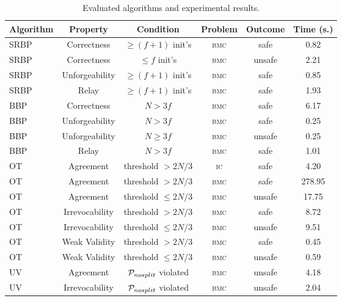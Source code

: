 \documentclass[11pt,a4paper]{article}
\begin{document}
{\begin{table}
\caption{\label{tabellone}Evaluated algorithms and experimental results.}
\centering
{\scriptsize
\begin{tabular}{|l|c|c|c|c|c|} \hline
\textbf{Algorithm} & \textbf{Property} & \textbf{Condition} & \textbf{Problem} & \textbf{Outcome} & \textbf{Time (s.)} \\ \hline
SRBP \cite{Srikanth87} & Correctness & $\geq (f+1)$ init's & \textsc{bmc} & safe & 0.82   \\ \hline
SRBP \cite{Srikanth87} & Correctness & $\leq f$ init's &  \textsc{bmc} & unsafe & 2.21  \\ \hline
SRBP \cite{Srikanth87} & Unforgeability & $\geq (f+1)$ init's & \textsc{bmc} & safe & 0.85  \\ \hline
SRBP \cite{Srikanth87} & Relay & $\geq (f+1)$ init's & \textsc{bmc} & safe & 1.93   \\ \hline
BBP \cite{toueg87} & Correctness & $N > 3f$ & \textsc{bmc} & safe & 6.17  \\ \hline
BBP \cite{toueg87} & Unforgeability & $N > 3f$ & \textsc{bmc} & safe & 0.25  \\ \hline
BBP \cite{toueg87} & Unforgeability & $N \geq 3f$ & \textsc{bmc} & unsafe & 0.25 \\ \hline
BBP \cite{toueg87} & Relay & $N > 3f$ & \textsc{bmc} & safe & 1.01  \\ \hline
OT \cite{sharpie} & Agreement & threshold $> 2N/3$ & \textsc{ic} & safe & 4.20 \\ \hline
OT \cite{sharpie} & Agreement & threshold $> 2N/3$ & \textsc{bmc} & safe & 278.95  \\ \hline
OT \cite{sharpie} & Agreement & threshold $\leq 2N/3$ & \textsc{bmc} & unsafe & 17.75  \\ \hline
OT \cite{sharpie} & Irrevocability & threshold $> 2N/3$ & \textsc{bmc} & safe & 8.72  \\ \hline
OT \cite{sharpie} & Irrevocability & threshold $\leq 2N/3$ & \textsc{bmc} & unsafe & 9.51  \\ \hline
OT \cite{sharpie} & Weak Validity & threshold $> 2N/3$ & \textsc{bmc} & safe & 0.45  \\ \hline
OT \cite{sharpie} & Weak Validity & threshold $\leq 2N/3$ & \textsc{bmc} & unsafe & 0.59  \\ \hline
UV \cite{heardof} & Agreement & ${\cal P}_{nosplit}$ violated & \textsc{bmc} & unsafe & 4.18  \\ \hline
UV \cite{heardof} & Irrevocability & ${\cal P}_{nosplit}$ violated & \textsc{bmc} & unsafe & 2.04  \\ \hline

\end{tabular}}
\end{table}}
\end{document}
